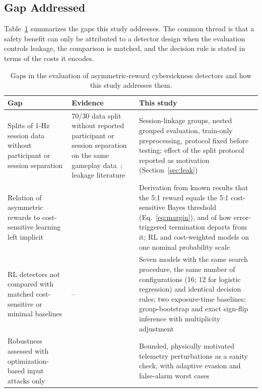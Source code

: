 \subsection{Gap Addressed}
Table~\ref{tab:gaps} summarizes the gaps this study addresses. The common thread is that a safety benefit can only be attributed to a detector design when the evaluation controls leakage, the comparison is matched, and the decision rule is stated in terms of the costs it encodes.

\begin{table}[t]
\centering
\caption{Gaps in the evaluation of asymmetric-reward cybersickness detectors and how this study addresses them.}
\label{tab:gaps}
\footnotesize
\begin{tabular}{p{}p{}p{}}
\toprule
Gap & Evidence & This study \\
\midrule
Splits of 1-Hz session data without participant or session separation & 70/30 data split without reported participant or session separation on the same gameplay data~\cite{kundu2022truvr}; leakage literature~\cite{kapoor2023leakage,kaufman2012leakage,roberts2017cv} & Session-linkage groups, nested grouped evaluation, train-only preprocessing, protocol fixed before testing; effect of the split protocol reported as motivation (Section~\ref{sec:leak}) \\
Relation of asymmetric rewards to cost-sensitive learning left implicit & \cite{lin2020imbalanced,yang2024drlimbalanced} & Derivation from known results that the 5:1 reward equals the 5:1 cost-sensitive Bayes threshold (Eq.~\ref{eq:margin}), and of how error-triggered termination departs from it; RL and cost-weighted models on one nominal probability scale \\
RL detectors not compared with matched cost-sensitive or minimal baselines & -- & Seven models with the same search procedure, the same number of configurations (16; 12 for logistic regression) and identical decision rules; two exposure-time baselines; group-bootstrap and exact sign-flip inference with multiplicity adjustment \\
Robustness assessed with optimization-based input attacks only & \cite{kundu2025securing,ahmed2025adversarialvr} & Bounded, physically motivated telemetry perturbations as a sanity check, with adaptive evasion and false-alarm worst cases \\
\bottomrule
\end{tabular}
\end{table}
